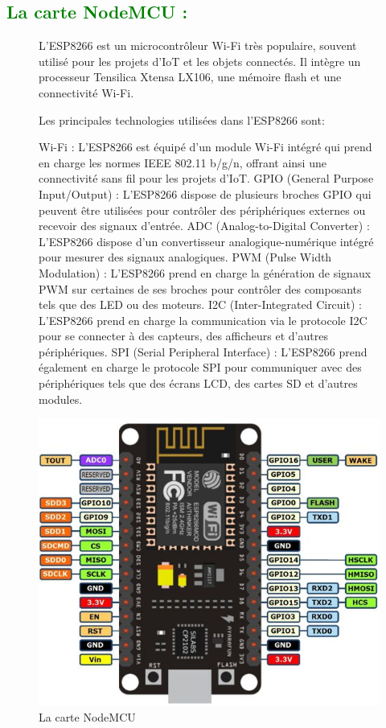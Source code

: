 \begin{flushleft}
	\subsection{\textcolor{green}{La carte NodeMCU :}}
		\begin{figure}[h]
			\begin{minipage}{0.6\textwidth}
				L'ESP8266 est un microcontrôleur Wi-Fi très populaire, souvent utilisé pour les projets d'IoT et les objets connectés. Il intègre un processeur Tensilica Xtensa LX106, une mémoire flash et une connectivité Wi-Fi.
				
				Les principales technologies utilisées dans l'ESP8266 sont:
				
				Wi-Fi : L'ESP8266 est équipé d'un module Wi-Fi intégré qui prend en charge les normes IEEE 802.11 b/g/n, offrant ainsi une connectivité sans fil pour les projets d'IoT.
				GPIO (General Purpose Input/Output) : L'ESP8266 dispose de plusieurs broches GPIO qui peuvent être utilisées pour contrôler des périphériques externes ou recevoir des signaux d'entrée.
				ADC (Analog-to-Digital Converter) : L'ESP8266 dispose d'un convertisseur analogique-numérique intégré pour mesurer des signaux analogiques.
				PWM (Pulse Width Modulation) : L'ESP8266 prend en charge la génération de signaux PWM sur certaines de ses broches pour contrôler des composants tels que des LED ou des moteurs.
				I2C (Inter-Integrated Circuit) : L'ESP8266 prend en charge la communication via le protocole I2C pour se connecter à des capteurs, des afficheurs et d'autres périphériques.
				SPI (Serial Peripheral Interface) : L'ESP8266 prend également en charge le protocole SPI pour communiquer avec des périphériques tels que des écrans LCD, des cartes SD et d'autres modules.
			\end{minipage}
			\begin{minipage}{0.4\textwidth}
				\centering
				\includegraphics[width=\textwidth]{chapitres/images/esp8266.jpg}
				\caption{La carte NodeMCU}
				\label{fig:votre_image}
			\end{minipage}
		\end{figure}
	\newpage

\end{flushleft}
